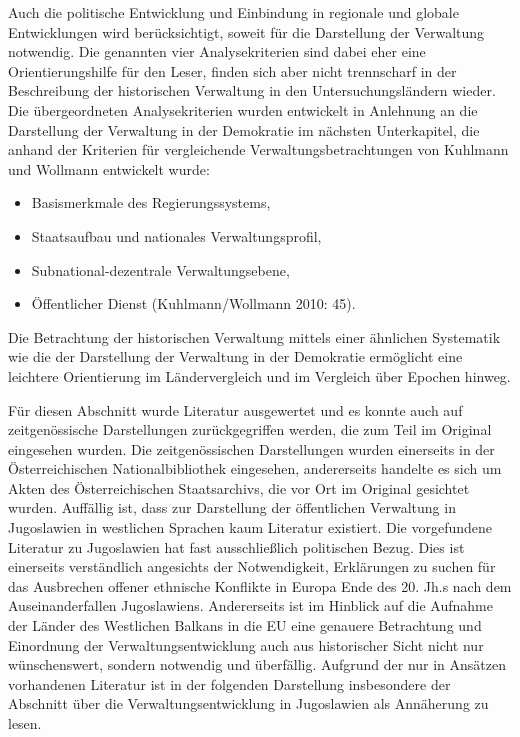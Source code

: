 Auch die politische Entwicklung und Einbindung in regionale und globale Entwicklungen wird berücksichtigt, soweit für die Darstellung der Verwaltung notwendig. Die genannten vier Analysekriterien sind dabei eher eine Orientierungshilfe für den Leser, finden sich aber nicht trennscharf in der Beschreibung der historischen Verwaltung in den Untersuchungsländern wieder. Die übergeordneten Analysekriterien wurden entwickelt in Anlehnung an die Darstellung der Verwaltung in der Demokratie im nächsten Unterkapitel, die anhand der Kriterien für vergleichende Verwaltungsbetrachtungen von Kuhlmann und Wollmann entwickelt wurde: 
\begin{itemize}
\item Basismerkmale des Regierungssystems,
\item Staatsaufbau und nationales Verwaltungsprofil, 
\item Subnational-dezentrale Verwaltungsebene,
\item Öffentlicher Dienst (Kuhlmann/Wollmann 2010: 45).
\end{itemize}
Die Betrachtung der historischen Verwaltung mittels einer ähnlichen Systematik wie die der Darstellung der Verwaltung in der Demokratie ermöglicht eine leichtere Orientierung im Ländervergleich und im Vergleich über Epochen hinweg. \par
Für diesen Abschnitt wurde Literatur ausgewertet und es konnte auch auf zeitgenössische Darstellungen zurückgegriffen werden, die zum Teil im Original eingesehen wurden. Die zeitgenössischen Darstellungen wurden einerseits in der Österreichischen Nationalbibliothek eingesehen, andererseits handelte es sich um Akten des Österreichischen Staatsarchivs, die vor Ort im Original gesichtet wurden. Auffällig ist, dass zur Darstellung der öffentlichen Verwaltung in Jugoslawien in westlichen Sprachen kaum Literatur existiert. Die vorgefundene Literatur zu Jugoslawien hat fast ausschließlich politischen Bezug. Dies ist einerseits verständlich angesichts der Notwendigkeit, Erklärungen zu suchen für das Ausbrechen offener ethnische Konflikte in Europa Ende des 20. Jh.s nach dem Auseinanderfallen Jugoslawiens. Andererseits ist im Hinblick auf die Aufnahme der Länder des Westlichen Balkans in die EU eine genauere Betrachtung und Einordnung der Verwaltungsentwicklung auch aus historischer Sicht nicht nur wünschenswert, sondern notwendig und überfällig. Aufgrund der nur in Ansätzen vorhandenen Literatur ist in der folgenden Darstellung insbesondere der Abschnitt über die Verwaltungsentwicklung in Jugoslawien als Annäherung zu lesen.
